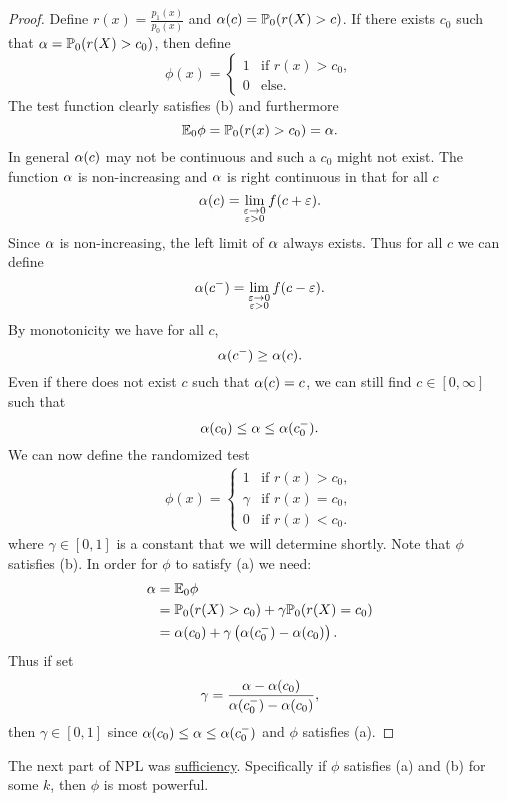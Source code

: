 \begin{proof}
    Define $r(x) = \frac{p_1(x)}{p_0(x)}$ and ${\alpha}(c) = {\mathbb{P}}_0(r(X)>c)$. If there exists $c_0$ such that ${\alpha} = {\mathbb{P}}_0(r(X) > c_0)$, then define 
    \[\phi(x) = \begin{cases}
        1 &\text{if } r(x) > c_0,\\
        0 & \text{else}.
    \end{cases} \]
    The test function clearly satisfies (b) and furthermore 
    \[{\mathbb{E}}_0 \phi = {\mathbb{P}}_0(r(x)>c_0)={\alpha}. \]
    In general ${\alpha}(c)$ may not be continuous and such a $c_0$ might not exist. The function ${\alpha}$ is non-increasing and ${\alpha}$ is right continuous in that for all $c$ 
    \[{\alpha}(c) = \lim_{\substack{\varepsilon \to 0\\ \varepsilon > 0}}f(c+\varepsilon).\]
    Since ${\alpha}$ is non-increasing, the left limit of ${\alpha}$ always exists. Thus for all $c$ we can define 
    \[{\alpha}(c^-) = \lim_{\substack{\varepsilon \to 0\\ \varepsilon > 0}}f(c-\varepsilon). \]
    By monotonicity we have for all $c$,
    \[{\alpha}(c^-) \ge {\alpha}(c). \]
    Even if there does not exist $c$ such that ${\alpha}(c)=c$, we can still find $c \in [0,\infty]$ such that 
    \[{\alpha}(c_0) \le {\alpha} \le {\alpha}(c_0^-). \]
    We can now define the randomized test 
    \begin{align*}
        \phi(x) = \begin{cases}
            1 & \text{if } r(x) > c_0,\\
            \gamma & \text{if } r(x)=c_0,\\
            0 & \text{if } r(x) < c_0.
        \end{cases}
    \end{align*}
    where $\gamma \in [0,1]$ is a constant that we will determine shortly. Note that $\phi$ satisfies (b). In order for $\phi$ to satisfy (a) we need:
    \begin{align*}
        {\alpha} &= {\mathbb{E}}_0 \phi \\
        &= {\mathbb{P}}_0(r(X) > c_0)+\gamma {\mathbb{P}}_0(r(X) = c_0)\\
        &= {\alpha}(c_0) +\gamma\left({\alpha}(c_0^-)-{\alpha}(c_0)\right).
    \end{align*}
    Thus if set 
    \[\gamma = \frac{{\alpha}-{\alpha}(c_0)}{{\alpha}(c_0^-)-{\alpha}(c_0)}, \]
    then $\gamma \in [0,1]$ since ${\alpha}(c_0) \le {\alpha} \le {\alpha}(c_0^-)$ and $\phi$ satisfies (a).
\end{proof}
The next part of NPL was \underline{sufficiency}. Specifically if $\phi$ satisfies (a) and (b) for some $k$, then $\phi$ is most powerful.
